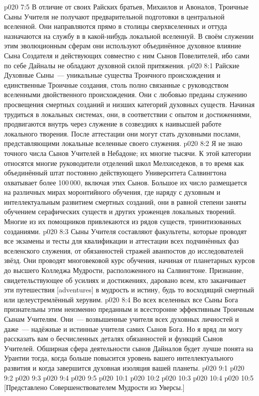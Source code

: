\vs p020 7:5 В отличие от своих Райских братьев, Михаилов и Авоналов, Троичные Сыны Учителя не получают предварительной подготовки в центральной вселенной. Они направляются прямо в столицы сверхвселенных и оттуда назначаются на службу в в какой\hyp{}нибудь локальной вселеннуй. В своём служении этим эволюционным сферам они используют объединённое духовное влияние Сына Создателя и действующих совместно с ним Сынов Повелителей, ибо сами по себе Дайналы не обладают духовной силой притяжения.
\vs p020 8:1 Райские Духовные Сыны~--- уникальные существа Троичного происхождения и единственные Троичные создания, столь полно связанные с руководством вселенными двойственного происхождения. Они с любовью преданы служению просвещения смертных созданий и низших категорий духовных существ. Начиная трудиться в локальных системах, они, в соответствии с опытом и достижениями, продвигаются внутрь через служение в созвездиях к наивысшей работе локального творения. После аттестации они могут стать духовными послами, представляющими локальные вселенные своего служения.
\vs p020 8:2 Я не знаю точного числа Сынов Учителей в Небадоне; их многие тысячи. К этой категории относятся многие руководители отделений школ Мелхиседеков, в то время как объединённый штат постоянно действующего Университета Салвингтона охватывает более 100\,000, включая этих Сынов. Большое их число размещается на различных мирах моронтийного обучения, где наряду с духовным и интеллектуальным развитием смертных созданий, они в равной степени заняты обучением серафических существ и других уроженцев локальных творений. Многие из их помощников привлекаются из рядов существ, тринитизованных созданиями.
\vs p020 8:3 Сыны Учителя составляют факультеты, которые проводят все экзамены и тесты для квалификации и аттестации всех подчинённых фаз вселенского служения, от обязанностей стражей аванпостов до исследователей звёзд. Они проводят многовековой курс обучения, начиная от планетарных курсов до высшего Колледжа Мудрости, расположенного на Салвингтоне. Признание, свидетельствующее об усилиях и достижениях, даровано всем, кто заканчивает эти путешествия [adventures] в мудрость и истину, будь то восходящий смертный или целеустремлённый херувим.
\vs p020 8:4 Во всех вселенных все Сыны Бога признательны этим неизменно преданным и всесторонне эффективным Троичным Сынам Учителям. Они~--- возвышенные учителя всех духовных личностей и даже~--- надёжные и истинные учителя самих Сынов Бога. Но я вряд ли могу рассказать вам о бесчисленных деталях обязанностей и функций Сынов Учителей. Обширная сфера деятельности сынов Дайналов будет лучше понята на Урантии тогда, когда больше повысится уровень вашего интеллектуального развития и когда завершится духовная изоляция вашей планеты.
\vs p020 9:1 
\vs p020 9:2 
\vs p020 9:3 
\vs p020 9:4 
\vs p020 9:5 \pc 
{}
\vs p020 10:1 
\vs p020 10:2 
\vs p020 10:3 
\vs p020 10:4 
\vsetoff
\vs p020 10:5 [Представлено Совершенствователем Мудрости из Уверсы.]
\quizlink
